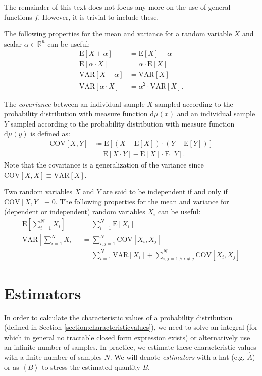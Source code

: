 \documentclass[10pt,a4paper]{article}
\numberwithin{equation}{section}
\begin{document}
The remainder of this text does not focus any more on the use of general functions $f$. However, it is trivial to include these.

The following properties for the mean and variance for a random variable $X$ and scalar $\alpha \in \mathbb{R}^{n}$ can be useful:
\begin{align}
\mathrm{E}\left[X + \alpha\right] 			&= \mathrm{E}\left[X\right] +\alpha \\
\mathrm{E}\left[\alpha \cdot X\right] 		&= \alpha \cdot \mathrm{E}\left[X\right] \\
\mathrm{VAR}\left[X + \alpha\right] 		&= \mathrm{VAR}\left[X\right]\\
\mathrm{VAR}\left[\alpha \cdot X\right] 	&= \alpha^{2} \cdot \mathrm{VAR}\left[X\right].
\end{align}

The \textit{covariance} between an individual sample $X$ sampled according to the probability distribution with measure function $\mathrm{d}\mu\left(x\right)$ and an individual sample $Y$ sampled according to the probability distribution with measure function $\mathrm{d}\mu\left(y\right)$ is defined as:
\begin{align}
\label{equation:COV}\mathrm{COV}\left[X, Y\right] &\coloneqq \mathrm{E}\left[\left(X-\mathrm{E}\left[X\right]\right) \cdot \left(Y-\mathrm{E}\left[Y\right]\right)\right] \\
&= \mathrm{E}\left[X \cdot Y\right] - \mathrm{E}\left[X\right] \cdot \mathrm{E}\left[Y\right].
\end{align}
Note that the covariance is a generalization of the variance since $\mathrm{COV}\left[X, X\right] \equiv \mathrm{VAR}\left[X\right]$. 

Two random variables $X$ and $Y$ are said to be independent if and only if $\mathrm{COV}\left[X, Y\right] \equiv 0$. The following properties for the mean and variance for (dependent or independent) random variables $X_{i}$ can be useful:
\begin{align}
\mathrm{E}\left[\sum_{i=1}^{N} X_{i}\right] 	&= {\sum_{i=1}^{N} \mathrm{E}\left[X_{i}\right]} \\
\mathrm{VAR}\left[\sum_{i=1}^{N} X_{i}\right] 	&= {\sum_{i,j=1}^{N} \mathrm{COV}\left[X_{i}, X_{j}\right]} \\
&= {\sum_{i=1}^{N} \mathrm{VAR}\left[X_{i}\right]} + {\sum_{i,j=1 \land i\ne j}^{N} \mathrm{COV}\left[X_{i}, X_{j}\right]} \nonumber
\end{align}

\section{Estimators}
\label{section-estimators}
In order to calculate the characteristic values of a probability distribution (defined in Section \ref{section:characteristicvalues}), we need to solve an integral (for which in general no tractable closed form expression exists) or alternatively use an infinite number of samples. In practice, we estimate these characteristic values with a finite number of samples $N$. We will denote \textit{estimators} with a hat (e.g. $\widehat{A}$) or as $\left<B\right>$ to stress the estimated quantity $B$.
\end{document}
